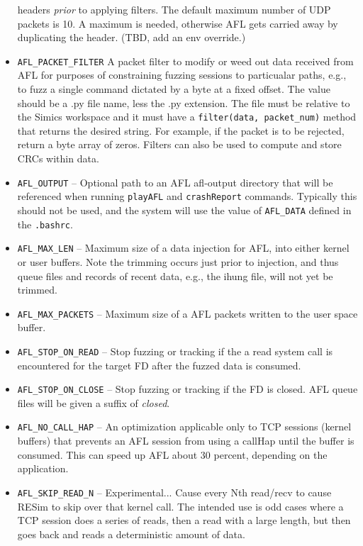 \documentclass[titlepage]{article}
\begin{document}
\begin{itemize}
headers \textit{prior} to applying filters.  The default maximum number of UDP packets is 10.  A maximum is needed, otherwise AFL gets carried away by duplicating
the header.  (TBD, add an env override.)
\item{\tt AFL\_PACKET\_FILTER} A packet filter to modify or weed out data received from AFL for purposes of constraining fuzzing sessions to
particualar paths, e.g., to fuzz a single command dictated by a byte at a fixed offset.  The value should be a .py file name, less the
.py extension.  The file must be relative to the Simics workspace and it must have a {\tt filter(data, packet\_num)} method that returns
the desired string.  For example, if the packet is to be rejected, return a byte array of zeros.  Filters can also be used to 
compute and store CRCs within data.  
\item {\tt AFL\_OUTPUT} -- Optional path to an AFL afl-output directory that will be referenced when running {\tt playAFL} and {\tt crashReport} commands. Typically this should not be used, and the system will use the value of {\tt AFL\_DATA} defined in the {\tt .bashrc}.
\item {\tt AFL\_MAX\_LEN} -- Maximum size of a data injection for AFL, into either kernel or user buffers. Note the trimming occurs just prior to injection,
and thus queue files and records of recent data, e.g., the ihung file, will not yet be trimmed.
\item {\tt AFL\_MAX\_PACKETS} -- Maximum size of a AFL packets written to the user space buffer.
\item {\tt AFL\_STOP\_ON\_READ} -- Stop fuzzing or tracking if the a read system call is encountered for the target FD after the fuzzed data is consumed.
\item {\tt AFL\_STOP\_ON\_CLOSE} -- Stop fuzzing or tracking if the FD is closed.  AFL queue files will be given a suffix of \textit{closed}.
\item {\tt AFL\_NO\_CALL\_HAP} -- An optimization applicable only to TCP sessions (kernel buffers) that prevents an AFL session 
from using a callHap until the buffer is consumed.  This can speed up AFL about 30 percent, depending on the application.
\item {\tt AFL\_SKIP\_READ\_N} -- Experimental... Cause every Nth read/recv to cause RESim to skip over that kernel call.  The intended use is odd
cases where a TCP session does a series of reads, then a read with a large length, but then goes back and reads a deterministic amount of data.


\end{itemize}
\end{document}
